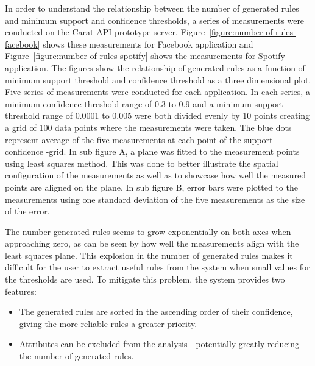 In order to understand the relationship between the number of generated rules and minimum support and confidence thresholds, a series of measurements were conducted on the Carat API prototype server. Figure~\ref{figure:number-of-rules-facebook} shows these  measurements for Facebook application and Figure~\ref{figure:number-of-rules-spotify} shows the measurements for Spotify application. The figures show the relationship of generated rules as a function of minimum support threshold and confidence threshold as a three dimensional plot. Five series of measurements were conducted for each application. In each series, a minimum confidence threshold range of 0.3 to 0.9 and a minimum support threshold range of 0.0001 to 0.005 were both divided evenly by 10 points creating a grid of 100 data points where the measurements were taken. The blue dots represent average of the five measurements at each point of the support-confidence -grid. In sub figure A, a plane was fitted to the measurement points using least squares method. This was done to better illustrate the spatial configuration of the measurements as well as to showcase how well the measured points are aligned on the plane. In sub figure B, error bars were plotted to the measurements using one standard deviation of the five measurements as the size of the error. 


The number generated rules seems to grow exponentially on both axes when approaching zero, as can be seen by how well the measurements align with the least squares plane. This explosion in the number of generated rules makes it difficult for the user to extract useful rules from the system when small values for the thresholds are used. To mitigate this problem, the system provides two features:

\begin{itemize}
	\item The generated rules are sorted in the ascending order of their confidence, giving the more reliable rules a greater priority.    
         
	\item Attributes can be excluded from the analysis - potentially greatly reducing the number of generated rules. 
\end{itemize}        

